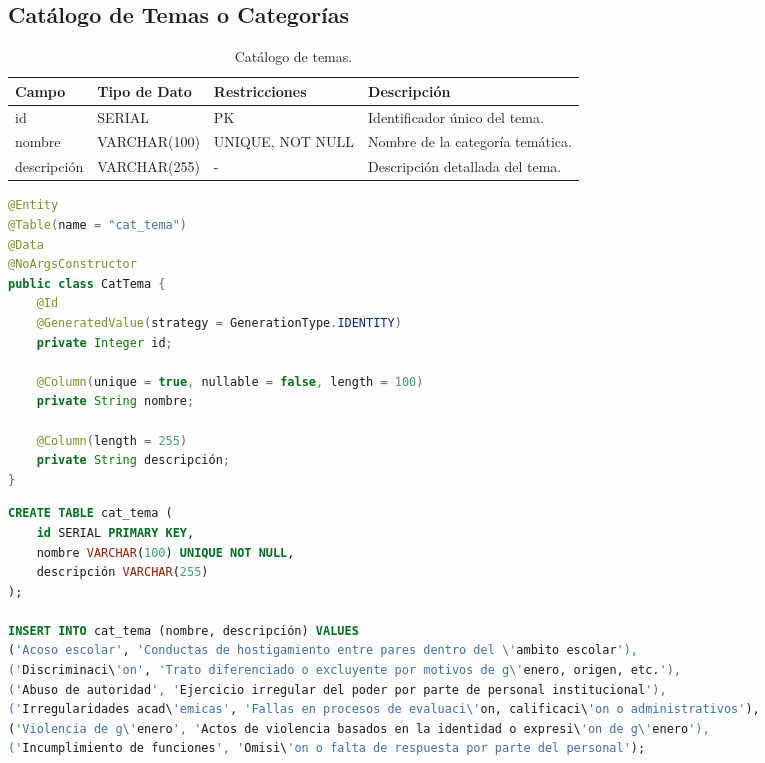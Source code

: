 \subsection{Cat\'alogo de Temas o Categor\'ias}

\begin{table}[H]
\centering
\small
\begin{tabularx}{\textwidth}{|l|l|l|X|}
\hline
\rowcolor{azulESCOM} 
\color{white}\textbf{Campo} & \color{white}\textbf{Tipo de Dato} & \color{white}\textbf{Restricciones} & \color{white}\textbf{Descripci\'on} \\ \hline
id & SERIAL & PK & Identificador \'unico del tema. \\ \hline
nombre & VARCHAR(100) & UNIQUE, NOT NULL & Nombre de la categor\'ia tem\'atica. \\ \hline
descripción & VARCHAR(255) & - & Descripci\'on detallada del tema. \\ \hline
\end{tabularx}
\caption{Cat\'alogo de temas.}
\label{tab:dict_cat_tema}
\end{table}

\begin{lstlisting}[language=Java, caption={Entidad Java para cat\'alogo de temas.}, label={lst:java_cat_tema}]
@Entity
@Table(name = "cat_tema")
@Data
@NoArgsConstructor
public class CatTema {
    @Id
    @GeneratedValue(strategy = GenerationType.IDENTITY)
    private Integer id;
    
    @Column(unique = true, nullable = false, length = 100)
    private String nombre;
    
    @Column(length = 255)
    private String descripción;
}
\end{lstlisting}

\begin{lstlisting}[language=SQL, caption={Script de creaci\'on e inicializaci\'on del cat\'alogo de temas.}, label={lst:sql_cat_tema}]
CREATE TABLE cat_tema (
    id SERIAL PRIMARY KEY,
    nombre VARCHAR(100) UNIQUE NOT NULL,
    descripción VARCHAR(255)
);

INSERT INTO cat_tema (nombre, descripción) VALUES 
('Acoso escolar', 'Conductas de hostigamiento entre pares dentro del \'ambito escolar'),
('Discriminaci\'on', 'Trato diferenciado o excluyente por motivos de g\'enero, origen, etc.'),
('Abuso de autoridad', 'Ejercicio irregular del poder por parte de personal institucional'),
('Irregularidades acad\'emicas', 'Fallas en procesos de evaluaci\'on, calificaci\'on o administrativos'),
('Violencia de g\'enero', 'Actos de violencia basados en la identidad o expresi\'on de g\'enero'),
('Incumplimiento de funciones', 'Omisi\'on o falta de respuesta por parte del personal');
\end{lstlisting}

